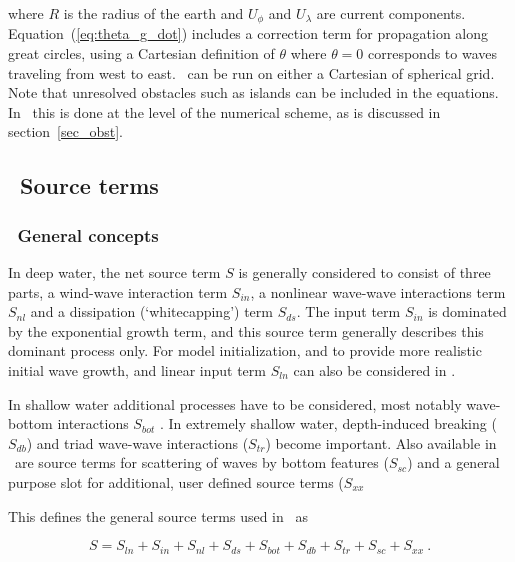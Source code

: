 \noindent
where $R$ is the radius of the earth and $U_\phi$ and $U_\lambda$ are current
components. Equation~(\ref{eq:theta_g_dot}) includes a correction term for
propagation along great circles, using a Cartesian definition of $\theta$
where $\theta = 0$ corresponds to waves traveling from west to east. \ws\ can
be run on either a Cartesian of spherical grid. Note that unresolved obstacles
such as islands can be included in the equations. In \ws\ this is done at the
level of the numerical scheme, as is discussed in section~\ref{sec_obst}.


\vssub
\subsection{~Source terms}
\vsssub
\subsubsection{~General concepts}
\vsssub

In deep water, the net source term $S$ is generally considered to consist of
three parts, a wind-wave interaction term $S_{in}$, a nonlinear wave-wave
interactions term $S_{nl}$ and a dissipation (`whitecapping') term $S_{ds}$.
The input term $S_{in}$ is dominated by the exponential growth term, and this
source term generally describes this dominant process only. For model
initialization, and to provide more realistic initial wave growth, and linear
input term $S_{ln}$ can also be considered in \ws.

In shallow water additional processes have to be considered, most notably
wave-bottom interactions $S_{bot}$ \cite[e.g.,][]{pro:Sea78}. In extremely
shallow water, depth-induced breaking ($S_{db}$) and triad wave-wave
interactions ($S_{tr}$) become important. Also available in \ws\ are source
terms for scattering of waves by bottom features ($S_{sc}$) and a general
purpose slot for additional, user defined source terms ($S_{xx}$

This defines the general source terms used in \ws\ as


\begin{equation}
S = S_{ln} + S_{in} + S_{nl} + S_{ds} + S_{bot} + S_{db} + S_{tr} + S_{sc} +
    S_{xx}\: .
\label{eq:general_st}
\end{equation}

